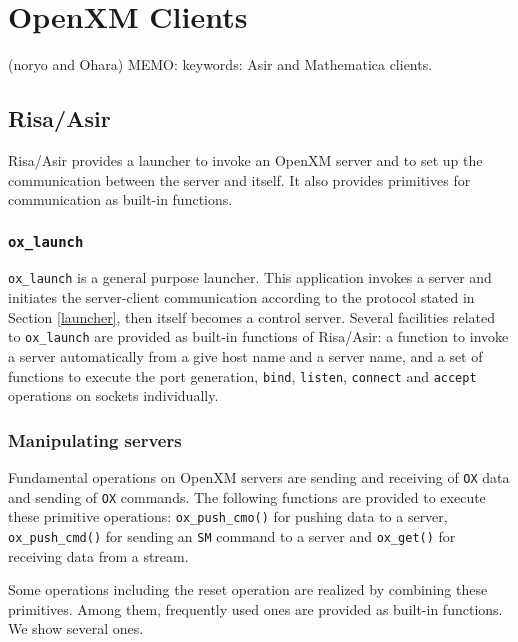 
\section{OpenXM Clients}    
(noryo and Ohara)
MEMO: keywords:
Asir and Mathematica clients.

\subsection{Risa/Asir}

Risa/Asir provides a launcher to invoke an OpenXM server and to set up the
communication between the server and itself. It also provides primitives
for communication as built-in functions.

\subsubsection{{\tt ox\_launch}}
{\tt ox\_launch} is a general purpose launcher.  This application
invokes a server and initiates the server-client communication
according to the protocol stated in Section \ref{launcher}, then
itself becomes a control server.
Several facilities related to {{\tt ox\_launch}} are provided
as built-in functions of Risa/Asir: a function to invoke a server
automatically from a give host name and a server name, and a set 
of functions to execute the port generation, {\tt bind}, {\tt listen},
{\tt connect} and {\tt accept} operations on sockets individually.

\subsubsection{Manipulating servers}

Fundamental operations on OpenXM servers are sending and receiving
of {\tt OX} data and sending of {\tt OX} commands. The following functions
are provided to execute these primitive operations:
{\tt ox\_push\_cmo()} for pushing data to a server, 
{\tt ox\_push\_cmd()} for sending an {\tt SM} command to a server
and {\tt ox\_get()} for receiving data from a stream.

Some operations including the reset operation are realized by
combining these primitives.  Among them, frequently used ones are
provided as built-in functions. We show several ones.

